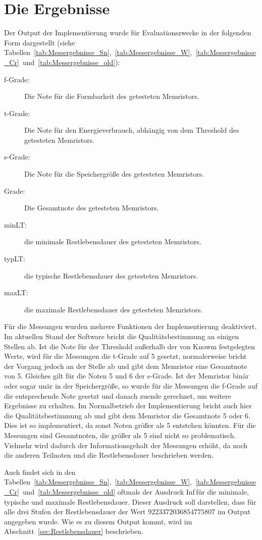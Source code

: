 \section{Die Ergebnisse}
Der Output der Implementierung wurde für Evaluationszwecke in der folgenden Form dargestellt (siehe Tabellen~\ref{tab:Messergebnisse_Sn},~\ref{tab:Messergebnisse_W},~\ref{tab:Messergebnisse_Cr}~und~\ref{tab:Messergebnisse_old}):
\begin{description}
  \item[f-Grade: ] Die Note für die Formbarkeit des getesteten Memristors.
  \item[t-Grade: ] Die Note für den Energieverbrauch, abhängig von dem Threshold des getesteten Memristors.
  \item[s-Grade: ] Die Note für die Speichergröße des getesteten Memristors.
  \item[Grade: ] Die Gesamtnote des getesteten Memristors.
  \item[minLT: ] die minimale Restlebensdauer des getesteten Memristors.
  \item[typLT:] die typische Restlebensdauer des getesteten Memristors.
  \item[maxLT:] die maximale Restlebensdauer des getesteten Memristors.
\end{description}
Für die Messungen wurden mehrere Funktionen der Implementierung deaktiviert. Im aktuellen Stand der Software bricht die Qualitätsbestimmung an einigen Stellen ab. Ist die Note für der Threshold außerhalb der von Knowm festgelegten Werte, wird für die Messungen die t-Grade auf 5 gesetzt, normalerweise bricht der Vorgang jedoch an der Stelle ab und gibt dem Memristor eine Gesamtnote von 5. Gleiches gilt für die Noten 5 und 6 der s-Grade. Ist der Memristor binär oder sogar unär in der Speichergröße, so wurde für die Messungen die f-Grade auf die entsprechende Note gesetzt und danach zuende gerechnet, um weitere Ergebnisse zu erhalten. Im Normalbetrieb der Implementierung bricht auch hier die Qualitätsbestimmung ab und gibt dem Memristor die Gesamtnote 5 oder 6. Dies ist so implementiert, da sonst Noten größer als 5 entstehen könnten. Für die Messungen sind Gesamtnoten, die größer als 5 sind nicht so problematisch. Vielmehr wird dadurch der Informationsgehalt der Messungen erhöht, da noch die anderen Teilnoten und die Restlebensdauer beschrieben werden.

Auch findet sich in den Tabellen~\ref{tab:Messergebnisse_Sn},~\ref{tab:Messergebnisse_W},~\ref{tab:Messergebnisse_Cr}~und~\ref{tab:Messergebnisse_old}
oftmals der Ausdruck \glqq Inf\grqq\,für die minimale, typische und maximale Restlebensdauer. Dieser Ausdruck soll darstellen, dass für alle drei Stufen der Restlebensdauer der Wert $9223372036854775807$ im Output angegeben wurde. Wie es zu diesem Output kommt, wird im Abschnitt~\ref{sec:Restlebensdauer} beschrieben.

